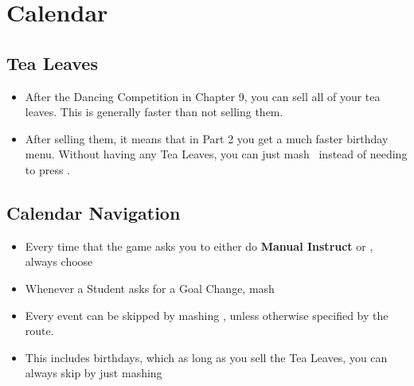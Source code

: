 \section*{Calendar}

\subsection*{Tea Leaves}
\begin{itemize}
\item After the Dancing Competition in Chapter 9, you can sell all of your tea leaves. This is generally faster than not selling them.
\item After selling them, it means that in Part 2 you get a much faster birthday menu. Without having any Tea Leaves, you can just mash \bbutton\, instead of needing to press \down\abutton.
\end{itemize}

\subsection*{Calendar Navigation}
\begin{itemize}
\item Every time that the game asks you to either do \textbf{Manual Instruct} or \autoInstruct, always choose \autoInstruct
\item Whenever a Student asks for a Goal Change, mash \bbutton
\item Every event can be skipped by mashing \bbutton, unless otherwise specified by the route.
\item This includes birthdays, which as long as you sell the Tea Leaves, you can always skip by just mashing \bbutton
\end{itemize}